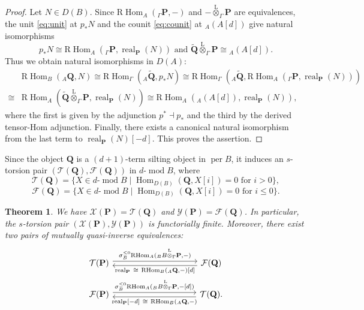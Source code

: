 \documentclass[11pt,a4paper,reqno]{amsart}
\theoremstyle{plain}
\newtheorem{theorem}{Theorem}[section]
\numberwithin{equation}{section}
\theoremstyle{definition}
\providecommand{\per}{\operatorname{per}}
\renewcommand{\mod}{\operatorname{mod}}
\newcommand{\Hom}{\operatorname{Hom}}
\newcommand{\RHom}{\mathrm R\!\Hom}
\newcommand{\real}{\operatorname{real}}
\newcommand{\Lotimes}{\overset{\mathrm L}{\otimes}}
\newcommand{\emod}[2]{#1\text{-}\!\mod #2}
\newcommand{\PP}{\mathbf{P}}
\newcommand{\QQ}{\mathbf{Q}}
\newcommand{\T}{\mathcal{T}}
\newcommand{\F}{\mathcal{F}}
\newcommand{\X}{\mathcal{X}}
\newcommand{\Y}{\mathcal{Y}}
\begin{document}
\begin{proof}
Let $N\in D(B)$. Since $\RHom_{A}({}_\Gamma\PP,-)$ and $-\Lotimes_{\Gamma}\PP$ are equivalences, the unit \eqref{eq:unit} at $p_*N$ and the counit
\eqref{eq:counit} at ${}_A(A[d])$ give natural isomorphisms
\[p_*N\cong\RHom_A({}_\Gamma\PP,\real_{\PP}(N))\text{ and }\widetilde{\QQ}\Lotimes_\Gamma\PP\cong{}_A(A[d]).\]
Thus we obtain natural isomorphisms in $D(A)$:
\begin{equation}\label{eq:2cong}
\begin{array}{rl}
     & \RHom_B({}_A\QQ,N)\cong\RHom_\Gamma({}_A\widetilde{\QQ},p_*N)\cong\RHom_\Gamma({}_A\widetilde{\QQ},\RHom_A({}_\Gamma\PP,\real_{\PP}(N)))\\
     \cong & \RHom_A(\widetilde{\QQ}\Lotimes_\Gamma\PP,\real_{\PP}(N)) \cong \RHom_A({}_A(A[d]),\real_{\PP}(N)),
\end{array}  
\end{equation}
where the first is given by the adjunction $p^*\dashv p_*$ and the third by the derived tensor-Hom adjunction. Finally, there exists a canonical natural isomorphism from the last term to $\real_{\PP}(N)[-d]$. This proves the assertion.
\end{proof}

Since the object $\QQ$ is a $(d+1)$-term silting object in $\per B$, it induces an $s$-torsion pair $(\T(\QQ),\F(\QQ))$ in $\emod{d}{B}$, where
\[\T(\QQ)=\{X\in\emod{d}{B}\mid \Hom_{D(B)}(\QQ,X[i])=0\text{ for }i>0\},\]
\[\F(\QQ)=\{X\in\emod{d}{B}\mid \Hom_{D(B)}(\QQ,X[i])=0\text{ for }i\leq 0\}.\]

\begin{theorem}\label{thm:higherBB}
  We have $\X(\PP)=\T(\QQ)$ and $\Y(\PP)=\F(\QQ)$. In particular, the $s$-torsion pair $(\X(\PP),\Y(\PP))$ is functorially finite. Moreover, there exist two pairs of mutually quasi-inverse equivalences: 
  \[
  \begin{tikzcd}[column sep=10em, row sep=2em]
    \T(\PP)\arrow[r, shift left=0.6ex, "{\sigma_B^{\leq0}\RHom_A({}_B B\Lotimes_\Gamma\PP,-)}"] & \F(\QQ) \arrow[l, shift left=0.6ex, "{\real_{\PP}\ \cong\ \RHom_B({}_A\QQ,-)[d]}"]\\
    \F(\PP) \arrow[r, shift left=0.6ex, "{\sigma_B^{\leq0}\RHom_A({}_B B\Lotimes_\Gamma\PP,-[d])}"] & \T(\QQ) \arrow[l, shift left=0.6ex, "{\real_{\PP}[-d]\ \cong\ \RHom_B({}_A\QQ,-)}"].
  \end{tikzcd}
\]
\end{theorem}
\end{document}
